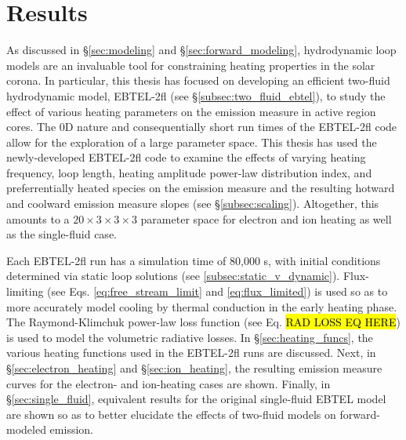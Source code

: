 \chapter{Results}
\label{ch:results}
%
\par As discussed in \S\ref{sec:modeling} and \S\ref{sec:forward_modeling}, hydrodynamic loop models are an invaluable tool for constraining heating properties in the solar corona. In particular, this thesis has focused on developing an efficient two-fluid hydrodynamic model, EBTEL-2fl (see \S\ref{subsec:two_fluid_ebtel}), to study the effect of various heating parameters on the emission measure in active region cores. The 0D nature and consequentially short run times of the EBTEL-2fl code allow for the exploration of a large parameter space. This thesis has used the newly-developed EBTEL-2fl code to examine the effects of varying heating frequency, loop length, heating amplitude power-law distribution index, and preferrentially heated species on the emission measure and the resulting hotward and coolward emission measure slopes (see \S\ref{subsec:scaling}). Altogether, this amounts to a $20\times3\times3\times3$ parameter space for electron and ion heating as well as the single-fluid case. 
%
\par Each EBTEL-2fl run has a simulation time of 80,000 s, with initial conditions determined via static loop solutions (see \ref{subsec:static_v_dynamic}). Flux-limiting (see Eqs. \ref{eq:free_stream_limit} and \ref{eq:flux_limited}) is used so as to more accurately model cooling by thermal conduction in the early heating phase. The Raymond-Klimchuk power-law loss function (see Eq. \hl{RAD LOSS EQ HERE}) is used to model the volumetric radiative losses. In \S\ref{sec:heating_funcs}, the various heating functions used in the EBTEL-2fl runs are discussed. Next, in \S\ref{sec:electron_heating} and \S\ref{sec:ion_heating}, the resulting emission measure curves for the electron- and ion-heating cases are shown. Finally, in \S\ref{sec:single_fluid}, equivalent results for the original single-fluid EBTEL model are shown so as to better elucidate the effects of two-fluid models on forward-modeled emission.
%
